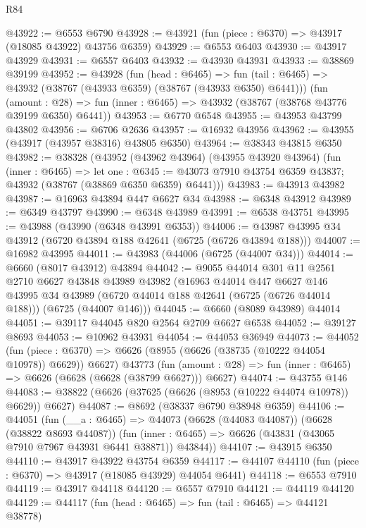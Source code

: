 \begin{lexlean}{R84}
\begin{coremodule}
@43922 := @6553 @6790
@43928 := @43921 (fun (piece : @6370) => @43917 (@18085 @43922) @43756 @6359)
@43929 := @6553 @6403
@43930 := @43917 @43929
@43931 := @6557 @6403
@43932 := @43930 @43931
@43933 := @38869 @39199
@43952 := @43928
    (fun (head : @6465) =>
    fun (tail : @6465) => @43932 (@38767 (@43933 @6359) (@38767 (@43933 @6350) @6441)))
    (fun (amount : @28) =>
    fun (inner : @6465) => @43932 (@38767 (@38768 @43776 @39199 @6350) @6441))
@43953 := @6770 @6548
@43955 := @43953 @43799 @43802
@43956 := @6706 @2636
@43957 := @16932 @43956
@43962 := @43955 (@43917 (@43957 @38316) @43805 @6350)
@43964 := @38343 @43815 @6350
@43982 := @38328
    (@43952
      (@43962 @43964)
      (@43955 @43920 @43964)
      (fun (inner : @6465) =>
      let one : @6345 := @43073 @7910 @43754 @6359 @43837;
      @43932 (@38767 (@38869 @6350 @6359) @6441)))
@43983 := @43913 @43982
@43987 := @16963 @43894 @447 @6627 @34
@43988 := @6348 @43912
@43989 := @6349 @43797
@43990 := @6348 @43989
@43991 := @6538 @43751
@43995 := @43988 (@43990 (@6348 @43991 @6353))
@44006 := @43987 @43995 @34 @43912 (@6720 @43894 @188 @42641 (@6725 (@6726 @43894 @188)))
@44007 := @16982 @43995
@44011 := @43983 (@44006 (@6725 (@44007 @34)))
@44014 := @6660 (@8017 @43912) @43894
@44042 := @9055
    @44014
    @301
    @11
    @2561
    @2710
    @6627
    @43848
    @43989
    @43982
    (@16963
      @44014
      @447
      @6627
      @146
      @43995
      @34
      @43989
      (@6720 @44014 @188 @42641 (@6725 (@6726 @44014 @188)))
      (@6725 (@44007 @146)))
@44045 := @6660 (@8089 @43989) @44014
@44051 := @39117 @44045 @820 @2564 @2709 @6627 @6538
@44052 := @39127 @8693
@44053 := @10962 @43931
@44054 := @44053 @36949
@44073 := @44052
    (fun (piece : @6370) => @6626 (@8955 (@6626 (@38735 (@10222 @44054 @10978)) @6629)) @6627)
    @43773
    (fun (amount : @28) => fun (inner : @6465) => @6626 (@6628 (@6628 (@38799 @6627))) @6627)
@44074 := @43755 @146
@44083 := @38822 (@6626 (@37625 (@6626 (@8953 (@10222 @44074 @10978)) @6629)) @6627)
@44087 := @8692 (@38337 @6790 @38948 @6359)
@44106 := @44051
    (fun (__a : @6465) =>
    @44073
      (@6628 (@44083 @44087))
      (@6628 (@38822 @8693 @44087))
      (fun (inner : @6465) => @6626 (@43831 (@43065 @7910 @7967 @43931 @6441 @38871)) @43844))
@44107 := @43915 @6350
@44110 := @43917 @43922 @43754 @6359
@44117 := @44107 @44110 (fun (piece : @6370) => @43917 (@18085 @43929) @44054 @6441)
@44118 := @6553 @7910
@44119 := @43917 @44118
@44120 := @6557 @7910
@44121 := @44119 @44120
@44129 := @44117
    (fun (head : @6465) => fun (tail : @6465) => @44121 @38778)

\end{coremodule}
\end{lexlean}

